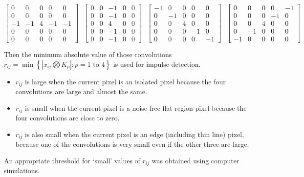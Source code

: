 \documentclass[10pt,fleqn]{article}
\begin{document}
\begin{itemize}
\begin{center}
$
\left[ \begin{matrix} 0 & 0 & 0 & 0 & 0 \\ 0 & 0 & 0 & 0 & 0 \\ -1 & -1 & 4 & -1 & -1 \\ 0 & 0 & 0 & 0 & 0 \\ 0 & 0 & 0 & 0 & 0 \end{matrix} \right]
\, \, \, \,  
\left[ \begin{matrix} 0 & 0 & -1 & 0 & 0 \\ 0 & 0 & -1 & 0 & 0 \\ 0 & 0 & 4 & 0 & 0 \\ 0 & 0 & -1 & 0 & 0 \\ 0 & 0 & -1 & 0 & 0 \end{matrix} \right]
\, \, \, \, 
\left[ \begin{matrix} -1 & 0 & 0 & 0 & 0 \\ 0 & -1 & 0 & 0 & 0 \\ 0 & 0 & 4 & 0 & 0 \\ 0 & 0 & 0 & -1 & 0 \\ 0 & 0 & 0 & 0 & -1 \end{matrix} \right]
\, \, \, \, 
\left[ \begin{matrix} 0 & 0 & 0 & 0 & -1 \\ 0 & 0 & 0 & -1 & 0 \\ 0 & 0 & 4 & 0 & 0 \\ 0 & -1 & 0 & 0 & 0 \\ -1 & 0 & 0 & 0 & 0 \end{matrix} \right] $
\end{center}

Then the minimum absolute value of those convolutions  $r_{ij} = \min \left\lbrace |x_{ij} \bigotimes K_p| : p = \text{1 to 4} \right\rbrace$ is used for impulse detection.

\begin{itemize}
\item $r_{ij}$ is large when the current pixel is an isolated pixel because the four convolutions are large and almost the same.

\item $r_{ij}$ is small when the current pixel is a noise-free flat-region pixel because the four convolutions are close to zero.

\item $r_{ij}$ is also small when the current pixel is an edge (including thin line) pixel, because one of the convolutions is very small even if the other three are large.
\end{itemize}

An appropriate threshold for `small' values of $r_{ij}$ was obtained using computer simulations.


\end{itemize}
\end{document}
